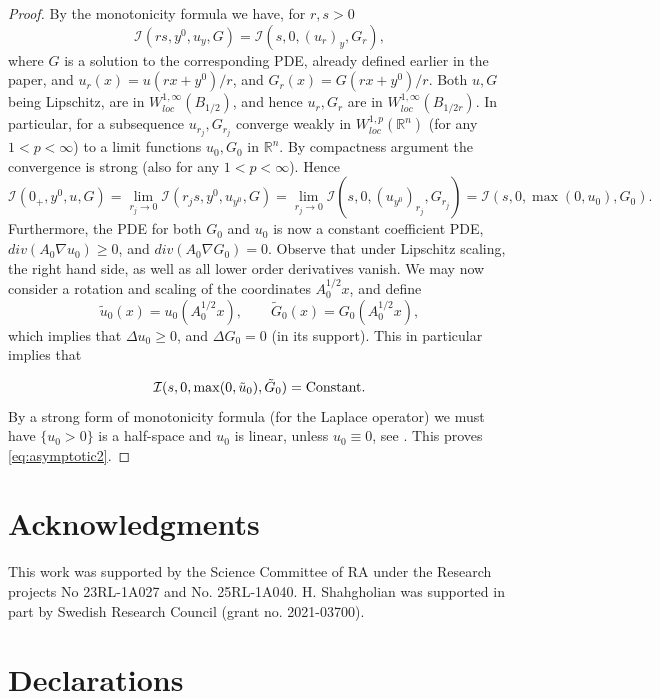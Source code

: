 \documentclass[11pt,reqno]{amsart}
\newcommand{\R}{{\mathbb R}}
\theoremstyle{plain}
\theoremstyle{remark}
\numberwithin{equation}{section}
\begin{document}
\begin{proof}
    
By the monotonicity formula we have, for $r,s > 0$
$$
\mathcal{I} (rs,y^0, u_y, G ) = \mathcal{I} (s,0, (u_r)_y, G_r ) ,
$$
where $G$ is a solution to the corresponding PDE, already defined earlier in the paper, and $u_r (x) = u(rx + y^0)/r$, and $G_r (x) = G(rx + y^0)/r$. 
Both $u, G$ being Lipschitz, are in $W_{loc}^{1,\infty} (B_{1/2}) $, and hence $u_r, G_r$ are in $W_{loc}^{1,\infty} (B_{1/2r}) $. In particular, for a subsequence $u_{r_j}, G_{r_j}$ converge weakly in $W_{loc}^{1,p} (\R^n) $ (for any $1< p < \infty $) to a limit functions $u_0, G_0$ in $\R^n$. By compactness argument the convergence is strong (also for any $1 < p < \infty $). Hence 
$$
\mathcal{I} (0_+, y^0, u, G)= 
\lim_{r_j \to 0}\mathcal{I} (r_js,y^0, u_{y^0}, G ) = \lim_{r_j \to 0} \mathcal{I} (s,0, (u_{y^0})_{r_j}, G_{r_j} ) =
\mathcal{I} (s,0, \max(0,u_0), G_0 ).
$$ 
Furthermore, the PDE for both  $G_0$ and $u_0$  is now  a constant coefficient PDE, $div (A_0 \nabla u_0) \geq 0$, and $div (A_0 \nabla G_0) = 0$.   Observe that under Lipschitz scaling, 
the right hand side, as well as all lower order derivatives vanish.
We may now consider a rotation and scaling of the coordinates $A_0^{1/2} x$, and define 
$$\tilde u_0 (x)= u_0(A_0^{1/2} x), \qquad
\tilde G_0 (x) = G_0(A_0^{1/2} x),
$$
which implies that $\Delta u_0 \geq 0$, and $\Delta G_0 =  0$ (in its support).  This in particular implies that 

$$\mathcal{I} (s,0, \max(0,\tilde u_0), \tilde G_0 ) = \hbox{Constant}.$$
By a strong form of monotonicity formula (for the Laplace operator) we must have $\{u_0 >0 \}$ is a half-space and $u_0$ is linear, unless $u_0 \equiv 0$, see \cite[Theorem 2.9]{PSU2012}.
This proves \eqref{eq:asymptotic2}.
\end{proof}


\section*{Acknowledgments}
This work was supported by the Science Committee of RA under the Research projects No 23RL-1A027 and No. 25RL-1A040. H. Shahgholian was supported in part by Swedish Research Council (grant no. 2021-03700).




\section*{Declarations}
\end{document}
